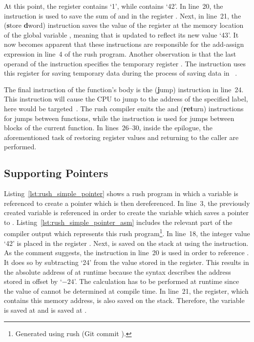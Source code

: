 At this point, the register  contains `1', while  contains `42'.
In line~20, the  instruction is used to save the sum of  and  in the register .
Next, in line~21, the  (\textbf{s}tore \textbf{d}word) instruction saves the value of the register  at the memory location of the global variable ,
meaning that  is updated to reflect its new value `43'.
It now becomes apparent that these instructions are responsible for the add-assign expression in line~4 of the rush program.
Another observation is that the last operand of the  instruction specifies the temporary register .
The instruction uses this register for saving temporary data during the process of saving data in ~\cite[Reference Card]{Patterson2017}.

The final instruction of the  function's body is the  (\textbf{j}ump) instruction in line~24.
This instruction will cause the CPU to jump to the address of the specified label,
here  would be targeted~\cite[p.~17]{Patterson2017}.
The rush compiler emits the  and  (\textbf{ret}urn) instructions for jumps between functions,
while the  instruction is used for jumps between blocks of the current function.
In lines~26--30, inside the epilogue, the aforementioned task of restoring register values and returning to the caller are performed.

\subsection{Supporting Pointers}

Listing~\ref{lst:rush_simple_pointer} shows a rush program in which a variable is referenced to create a pointer which is then dereferenced.
In line~3, the previously created variable  is referenced in order to create the variable  which saves a pointer to .
Listing~\ref{lst:rush_simple_pointer_asm} includes the relevant part of the compiler output which represents this rush program\footnote{Generated using rush (Git commit \rushCommit{}).}.
In line~18, the integer value `42' is placed in the register .
Next,  is saved on the stack at  using the  instruction.
As the comment suggests, the instruction in line~20 is used in order to reference .
It does so by subtracting `24' from the value stored in the  register.
This results in the absolute address of  at runtime because the syntax  describes the address stored in  offset by `$-24$'.
The calculation has to be performed at runtime since the value of  cannot be determined at compile time.
In line~21, the  register, which contains this memory address, is also saved on the stack.
Therefore, the  variable is saved at  and  is saved at .

